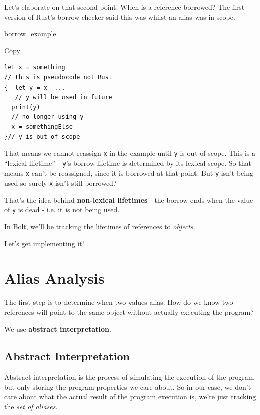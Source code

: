 Let's elaborate on that second point. When is a reference borrowed? The
first version of Rust's borrow checker said this was whilst an alias was
in scope.

{borrow\_example}

Copy

\begin{verbatim}
let x = something 
// this is pseudocode not Rust
{  let y = x  ...
   // y will be used in future
  print(y)
  // no longer using y
  x = somethingElse
}// y is out of scope
\end{verbatim}

That means we cannot reassign \texttt{x} in the example until \texttt{y}
is out of scope. This is a ``lexical lifetime'' - \texttt{y}'s borrow
lifetime is determined by its lexical scope. So that means \texttt{x}
can't be reassigned, since it is borrowed at that point. But \texttt{y}
isn't being used so surely \texttt{x} isn't still borrowed?

That's the idea behind \textbf{non-lexical lifetimes} - the borrow ends
when the value of \texttt{y} is dead - i.e. it is not being used.

In Bolt, we'll be tracking the lifetimes of references to
\emph{objects}.

Let's get implementing it!

\hypertarget{alias-analysis}{%
\section{\texorpdfstring{\protect\hyperlink{alias-analysis}{}Alias
Analysis}{Alias Analysis}}\label{alias-analysis}}

The first step is to determine when two values alias. How do we know two
references will point to the same object without actually executing the
program?

We use \textbf{abstract interpretation}.

\hypertarget{abstract-interpretation}{%
\subsection{\texorpdfstring{\protect\hyperlink{abstract-interpretation}{}Abstract
Interpretation}{Abstract Interpretation}}\label{abstract-interpretation}}

Abstract interpretation is the process of simulating the execution of
the program but only storing the program properties we care about. So in
our case, we don't care about what the actual result of the program
execution is, we're just tracking the \emph{set of aliases}.

